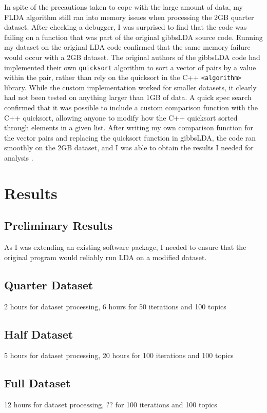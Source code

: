 \documentclass[a4paper]{article}
\begin{document}
In spite of the precautions taken to cope with the large amount of data, my FLDA algorithm still ran into memory issues when processing the 2GB quarter dataset. After checking a debugger, I was surprised to find that the code was failing on a function that was part of the original gibbsLDA source code. Running my dataset on the original LDA code confirmed that the same memory failure would occur with a 2GB dataset. The original authors of the gibbsLDA code had implemented their own \verb+quicksort+ algorithm to sort a vector of pairs by a value within the pair, rather than rely on the quicksort in the C++ \verb+<algorithm>+ library. While the custom implementation worked for smaller datasets, it clearly had not been tested on anything larger than 1GB of data. A quick spec search confirmed that it was possible to include a custom comparison function with the C++ quicksort, allowing anyone to modify how the C++ quicksort sorted through elements in a given list. After writing my own comparison function for the vector pairs and replacing the quicksort function in gibbsLDA, the code ran smoothly on the 2GB dataset, and I was able to obtain the results I needed for analysis \cite{gibbs_lda}.

\section{Results}
\label{sec:results}
\subsection{Preliminary Results}
As I was extending an existing software package, I needed to ensure that the original program would reliably run LDA on a modified dataset.

\subsection{Quarter Dataset}
2 hours for dataset processing, 6 hours for 50 iterations and 100 topics

\subsection{Half Dataset}
5 hours for dataset processing, 20 hours for 100 iterations and 100 topics

\subsection{Full Dataset}
12 hours for dataset processing, ?? for 100 iterations and 100 topics
\end{document}
